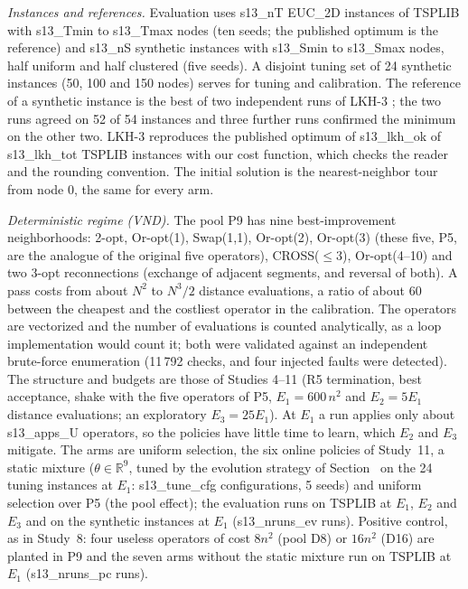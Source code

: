 \emph{Instances and references.} Evaluation uses \num{s13_nT} EUC\_2D instances of TSPLIB \citep{reinelt1991} with \num{s13_Tmin} to \num{s13_Tmax} nodes (ten seeds; the published optimum is the reference) and \num{s13_nS} synthetic instances with \num{s13_Smin} to \num{s13_Smax} nodes, half uniform and half clustered (five seeds). A disjoint tuning set of 24 synthetic instances (50, 100 and 150 nodes) serves for tuning and calibration. The reference of a synthetic instance is the best of two independent runs of LKH-3 \citep{helsgaun2000}; the two runs agreed on 52 of 54 instances and three further runs confirmed the minimum on the other two. LKH-3 reproduces the published optimum of \num{s13_lkh_ok} of \num{s13_lkh_tot} TSPLIB instances with our cost function, which checks the reader and the rounding convention. The initial solution is the nearest-neighbor tour from node 0, the same for every arm.

\emph{Deterministic regime (VND).} The pool P9 has nine best-improvement neighborhoods: 2-opt, Or-opt(1), Swap(1,1), Or-opt(2), Or-opt(3) (these five, P5, are the analogue of the original five operators), CROSS($\le3$), Or-opt(4--10) and two 3-opt reconnections (exchange of adjacent segments, and reversal of both). A pass costs from about $N^2$ to $N^3/2$ distance evaluations, a ratio of about 60 between the cheapest and the costliest operator in the calibration. The operators are vectorized and the number of evaluations is counted analytically, as a loop implementation would count it; both were validated against an independent brute-force enumeration (11\,792 checks, and four injected faults were detected). The structure and budgets are those of Studies 4--11 (R5 termination, best acceptance, shake with the five operators of P5, $E_1=600\,n^2$ and $E_2=5E_1$ distance evaluations; an exploratory $E_3=25E_1$). At $E_1$ a run applies only about \num{s13_apps_U} operators, so the policies have little time to learn, which $E_2$ and $E_3$ mitigate. The arms are uniform selection, the six online policies of Study~11, a static mixture ($\theta\in\mathbb{R}^9$, tuned by the evolution strategy of Section~ on the 24 tuning instances at $E_1$: \num{s13_tune_cfg} configurations, 5 seeds) and uniform selection over P5 (the pool effect); the evaluation runs on TSPLIB at $E_1$, $E_2$ and $E_3$ and on the synthetic instances at $E_1$ (\num{s13_nruns_ev} runs). Positive control, as in Study~8: four useless operators of cost $8n^2$ (pool D8) or $16n^2$ (D16) are planted in P9 and the seven arms without the static mixture run on TSPLIB at $E_1$ (\num{s13_nruns_pc} runs).

